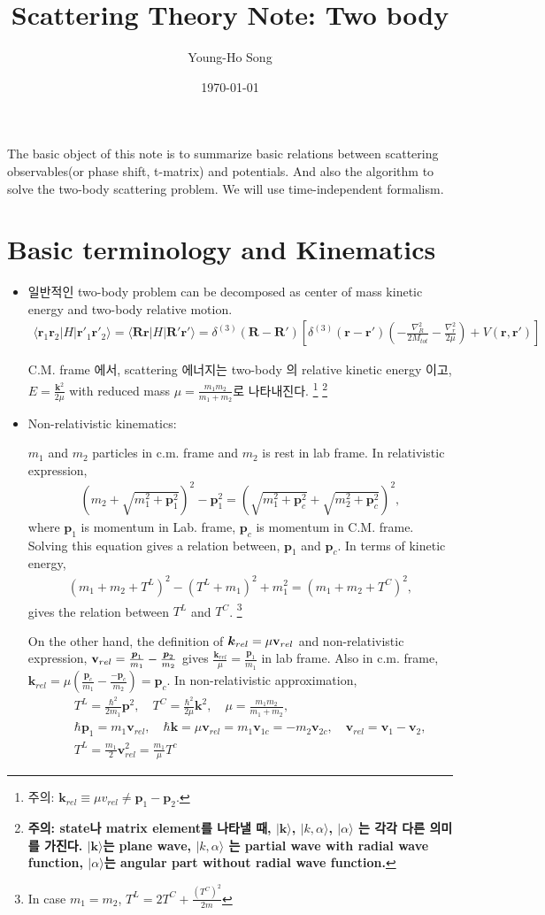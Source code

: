 \documentclass[10pt]{article}
\title{Scattering Theory Note: Two body}
\author{Young-Ho Song}
\date{\today}
\def\bm{\boldsymbol}
\newcommand{\bea}{\begin{eqnarray}}
\newcommand{\eea}{\end{eqnarray}}
\newcommand{\no}{\nonumber \\}
\def\vp{{\bm p}}
\def\vk{{\bm k}}
\def\vr{{\bm r}}
\def\vR{{\bm R}}
\def\la{\langle}
\def\ra{\rangle}
\begin{document}
\maketitle
\tableofcontents
\newpage

The basic object of this note is to summarize basic 
relations between scattering
observables(or phase shift, t-matrix) and potentials. 
And also the algorithm
to solve the two-body scattering problem. We will use 
time-independent formalism. 

\section{Basic terminology and Kinematics}
\label{sec:1}
\begin{itemize}
\item 일반적인 two-body problem can be decomposed as 
center of mass kinetic energy and two-body relative 
motion.
\bea
\la \vr_1 \vr_2|H|\vr'_1\vr'_2\ra
=\la \vR \vr|H|\vR' \vr'\ra
=\delta^{(3)}(\vR-\vR')
 \left[
 \delta^{(3)}(\vr-\vr')\left(-\frac{\nabla^2_R}{2M_{tot}}
                       -\frac{\nabla_r^2}{2\mu}\right)
 +V(\vr,\vr')\right]                      
\eea

C.M. frame 에서,
scattering 에너지는 two-body 의 relative kinetic energy 이고,
$E=\frac{\vk^2}{2\mu}$ with reduced mass 
$\mu=\frac{m_1m_2}{m_1+m_2}$로 나타내진다. 
\footnote{
주의: $\vk_{rel}\equiv \mu v_{rel} \neq \vp_1-\vp_2$.}
\footnote{
{\bf 주의: state나 matrix element를 나타낼 때,
$|\vk\ra$, $|k, \alpha\ra$, $|\alpha\ra$ 는 각각
다른 의미를 가진다. $|\vk\ra$는 plane wave, $|k,\alpha\ra$ 는
partial wave with radial wave function, $|\alpha\ra$는 
angular part without radial wave function.}
}

\item Non-relativistic kinematics: 

$m_1$ and $m_2$ particles in c.m. frame and
$m_2$ is rest in lab frame.
In relativistic expression,
\bea
(m_2+\sqrt{m_1^2+\vp_1^2})^2-\vp_1^2 
       =(\sqrt{m_1^2+\vp_c^2}+\sqrt{m_2^2+\vp_c^2})^2,
\eea
where $\vp_{1}$ is momentum in Lab. frame, $\vp_c$ is momentum in
C.M. frame. Solving this equation gives a relation between,
$\vp_1$ and $\vp_c$. In terms of kinetic energy,
\bea
(m_1+m_2+T^L)^2-(T^L+m_1)^2+m_1^2
=(m_1+m_2+T^C)^2,
\eea
gives the relation between $T^L$ and $T^C$.
\footnote{In case $m_1=m_2$, $T^L=2 T^C+\frac{(T^{C})^2}{2m}$}

On the other hand, the definition of 
$\vk_{rel}=\mu{\bf v}_{rel}$ and non-relativistic expression,
${\bf v}_{rel}=\frac{\vp_1}{m_1}-\frac{\vp_2}{m_2}$ gives
$\frac{\vk_{rel}}{\mu}=\frac{\vp_1}{m_1}$ in lab frame.
Also in c.m. frame, 
$\vk_{rel}=\mu(\frac{\vp_c}{m_1}-\frac{-\vp_c}{m_2})=\vp_c$.
In non-relativistic approximation,
\bea
& &T^L=\frac{\hbar^2}{2m_1}\vp^2,\quad T^C=\frac{\hbar^2}{2\mu}\vk^2,
\quad \mu=\frac{m_1 m_2}{m_1+m_2},\no
& &\hbar{\vp}_1=m_1{\bm v}_{rel},\quad
\hbar\vk=\mu{\bm v}_{rel}=m_1{\bm v}_{1c}=-m_2{\bm v}_{2c},
\quad {\bm v}_{rel}={\bm v}_1-{\bm v}_2,
\no
& &
 T^L=\frac{m_1}{2}{\bm v}_{rel}^2=\frac{m_1}{\mu}T^c
\eea


\end{itemize}
\end{document}
